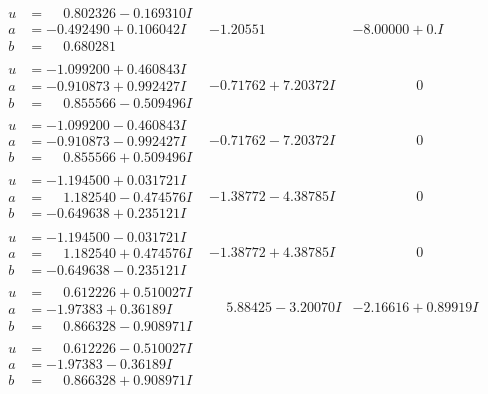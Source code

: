 \documentclass[1p]{elsarticle_modified}
\theoremstyle{definition}
\begin{document}
$$\begin{array}{c|c|c}
\begin{aligned}
u &= \phantom{-}0.802326 - 0.169310 I \\
a &= -0.492490 + 0.106042 I \\
b &= \phantom{-}0.680281\phantom{ +0.000000I}\end{aligned}
 & -1.20551\phantom{ +0.000000I} & -8.00000 + 0. I\phantom{ +0.000000I} \\ \hline\begin{aligned}
u &= -1.099200 + 0.460843 I \\
a &= -0.910873 + 0.992427 I \\
b &= \phantom{-}0.855566 - 0.509496 I\end{aligned}
 & -0.71762 + 7.20372 I & \phantom{-0.000000 } 0 \\ \hline\begin{aligned}
u &= -1.099200 - 0.460843 I \\
a &= -0.910873 - 0.992427 I \\
b &= \phantom{-}0.855566 + 0.509496 I\end{aligned}
 & -0.71762 - 7.20372 I & \phantom{-0.000000 } 0 \\ \hline\begin{aligned}
u &= -1.194500 + 0.031721 I \\
a &= \phantom{-}1.182540 - 0.474576 I \\
b &= -0.649638 + 0.235121 I\end{aligned}
 & -1.38772 - 4.38785 I & \phantom{-0.000000 } 0 \\ \hline\begin{aligned}
u &= -1.194500 - 0.031721 I \\
a &= \phantom{-}1.182540 + 0.474576 I \\
b &= -0.649638 - 0.235121 I\end{aligned}
 & -1.38772 + 4.38785 I & \phantom{-0.000000 } 0 \\ \hline\begin{aligned}
u &= \phantom{-}0.612226 + 0.510027 I \\
a &= -1.97383 + 0.36189 I \\
b &= \phantom{-}0.866328 - 0.908971 I\end{aligned}
 & \phantom{-}5.88425 - 3.20070 I & -2.16616 + 0.89919 I \\ \hline\begin{aligned}
u &= \phantom{-}0.612226 - 0.510027 I \\
a &= -1.97383 - 0.36189 I \\
b &= \phantom{-}0.866328 + 0.908971 I\end{aligned}

\end{array}$$
\end{document}
